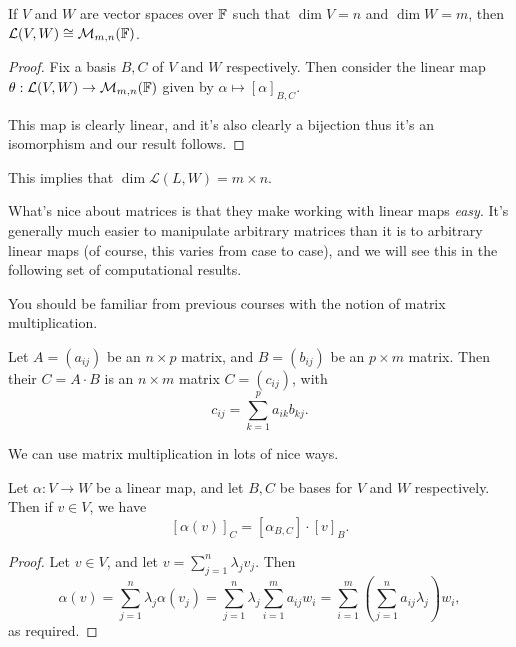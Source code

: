 \documentclass[a4paper]{scrartcl}
\begin{document}
\begin{proposition}
    If $V$ and $W$ are vector spaces over $\mathbb{F}$ such that $\dim V = n$ and $\dim W = m$, then $\mathcal{L}(V, W) \cong \mathcal{M}_{m, n}(\mathbb{F})$.
\end{proposition}
\begin{proof}
    Fix a basis $B, C$ of $V$ and $W$ respectively.
    Then consider the linear map
    $
    \theta: \mathcal{L}(V, W) \rightarrow \mathcal{M}_{m, n}(\mathbb{F})
    $ given by $\alpha \mapsto [\alpha]_{B, C}$.

    This map is clearly linear, and it's also clearly a bijection thus it's an isomorphism and our result follows.
\end{proof}

\begin{remark}
    This implies that $\dim \mathcal{L}(L, W) = m \times n$.
\end{remark}


What's nice about matrices is that they make working with linear maps \emph{easy}. It's generally much easier to manipulate arbitrary matrices than it is to arbitrary linear maps (of course, this varies from case to case), and we will see this in the following set of computational results.

You should be familiar from previous courses with the notion of matrix multiplication.

\begin{definition}
    Let $A = (a_{ij})$ be an $n \times p$ matrix, and $B = (b_{ij})$ 
    be an $p \times m$ matrix.
    Then their  $C = A\cdot B$ is an $n \times m$ matrix $C = (c_{ij})$, with
    $$
    c_{ij} = \sum_{k = 1}^p a_{ik}b_{kj}.
    $$
\end{definition}

We can use matrix multiplication in lots of nice ways.

\begin{lemma}
    Let $\alpha: V \rightarrow W$ be a linear map, and let $B, C$ be bases for $V$ and $W$ respectively. Then if $v \in V$, we have
    $$
    [\alpha(v)]_C = [\alpha_{B,C}] \cdot [v]_B.
    $$
\end{lemma}
\begin{proof}
    Let $v \in V$, and let $v = \sum_{j = 1}^n \lambda_j v_j$. Then
    $$
    \alpha(v) = \sum_{j = 1}^n \lambda_j \alpha(v_j) = \sum_{j = 1}^n \lambda_j \sum_{i = 1}^m a_{ij} w_i = \sum_{i = 1}^m \left(\sum_{j = 1}^n a_{ij} \lambda_j\right) w_i,
    $$
    as required.
\end{proof}
\end{document}
